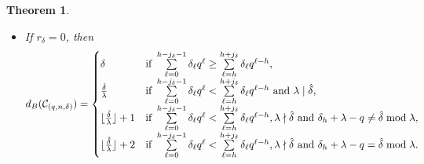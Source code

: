 \documentclass[journal,onecolumn]{IEEEtran}
\newtheorem{theorem}{Theorem}
\begin{document}
\begin{theorem}
\begin{itemize}
 \item If $r_{\delta} = 0$, then
\begin{equation}\label{65}
d_B(\mathcal{C}_{(q,n,\delta)}) = \begin{cases}
\delta &\hbox{if } \sum\limits\limits_{\ell=0}^{h-j_{\delta}-1} \delta_{\ell} q^{\ell} \geq  \sum\limits_{\ell=h}^{h + j_{\delta}} \delta_{\ell} q^{\ell - h}, \\
 \frac{\hat{\delta}}{\lambda}  &\hbox{if } \sum\limits_{\ell=0}^{h-j_{\delta}-1} \delta_{\ell} q^{\ell} < \sum\limits_{\ell=h}^{h + j_{\delta}} \delta_{\ell} q^{\ell - h}\hbox{ and }\lambda\mid \hat{\delta},\\
\lfloor \frac{\hat{\delta}}{\lambda} \rfloor +1 &\hbox{if } \sum\limits_{\ell=0}^{h-j_{\delta}-1} \delta_{\ell} q^{\ell} < \sum\limits_{\ell=h}^{h + j_{\delta}} \delta_{\ell} q^{\ell - h}, \lambda\nmid \hat{\delta} \hbox{ and }  \delta_h+\lambda-q\neq \hat{\delta} \bmod \lambda,\\
\lfloor \frac{\hat{\delta}}{\lambda} \rfloor +2 &\hbox{if } \sum\limits_{\ell=0}^{h-j_{\delta}-1} \delta_{\ell} q^{\ell} < \sum\limits_{\ell=h}^{h + j_{\delta}} \delta_{\ell} q^{\ell - h}, \lambda\nmid \hat{\delta} \hbox{ and }\delta_h+\lambda-q=  \hat{\delta} \bmod \lambda. 
\end{cases}
\end{equation}
\end{itemize}
\end{theorem}
\end{document}
